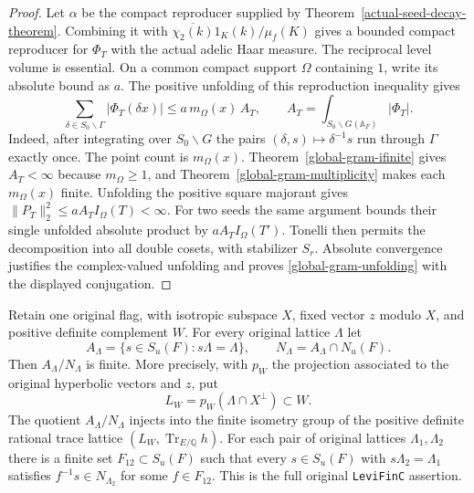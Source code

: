 \begin{proof}
Let $\alpha$ be the compact reproducer supplied by
Theorem~\ref{actual-seed-decay-theorem}.  Combining it with
$\overline{\chi_2(k)}1_K(k)/\mu_f(K)$ gives a bounded compact
reproducer for $\Phi_T$ with the actual adelic Haar measure.
The reciprocal level volume is essential.  On a common compact
support $\Omega$ containing $1$, write its absolute bound as $a$.
The positive unfolding of this reproduction inequality gives
\[
 \sum_{\delta\in S_0\backslash\Gamma}|\Phi_T(\delta x)|
 \le a\,m_\Omega(x)\,A_T,
 \qquad A_T=\int_{S_0\backslash G(\mathbb A_F)}|\Phi_T|.
\]
Indeed, after integrating over $S_0\backslash G$ the pairs
$(\delta,s)\mapsto\delta^{-1}s$ run through $\Gamma$ exactly once.
The point count is $m_\Omega(x)$.  Theorem~\ref{global-gram-ifinite}
gives $A_T<\infty$ because $m_\Omega\ge1$, and
Theorem~\ref{global-gram-multiplicity} makes each $m_\Omega(x)$ finite.
Unfolding the positive square majorant gives
$\|P_T\|_2^2\le a A_T I_\Omega(T)<\infty$.
For two seeds the same argument bounds their single unfolded
absolute product by $a A_T I_\Omega(T')$.  Tonelli then permits
the decomposition into all double cosets, with stabilizer $S_r$.
Absolute convergence justifies the complex-valued unfolding and
proves \eqref{global-gram-unfolding} with the displayed conjugation.
\end{proof}

\begin{theorem}
\label{global-gram-levi-fibres}
Retain one original flag, with isotropic subspace $X$, fixed vector
$z$ modulo $X$, and positive definite complement $W$.  For every
original lattice $\Lambda$ let
\[
 A_\Lambda=\{s\in S_u(F):s\Lambda=\Lambda\},\qquad
 N_\Lambda=A_\Lambda\cap N_u(F).
\]
Then $A_\Lambda/N_\Lambda$ is finite.  More precisely, with $p_W$
the projection associated to the original hyperbolic vectors and $z$,
put
\[
 L_W=p_W(\Lambda\cap X^\perp)\subset W.
\]
The quotient $A_\Lambda/N_\Lambda$ injects into the finite isometry
group of the positive definite rational trace lattice
$(L_W,\operatorname{Tr}_{E/\mathbb Q}h)$.
For each pair of original lattices $\Lambda_1,\Lambda_2$ there is
a finite set $F_{12}\subset S_u(F)$ such that every
$s\in S_u(F)$ with $s\Lambda_2=\Lambda_1$ satisfies
$f^{-1}s\in N_{\Lambda_2}$ for some $f\in F_{12}$.
This is the full original \texttt{LeviFinC} assertion.
\end{theorem}

